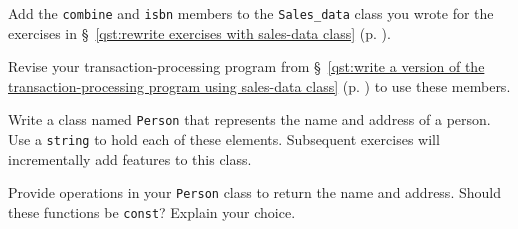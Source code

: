 %
%
\begin{question}
Add the \verb|combine| and \verb|isbn| members to the \verb|Sales_data|
class you wrote for the exercises in \S~\ref{qst:rewrite exercises with sales-data class} (p. \pageref{qst:rewrite exercises with sales-data class}).
\end{question}

\begin{question}\label{qst:revise your transaction-processing program using combine and isbn}
Revise your transaction-processing program from \S~\ref{qst:write a version of the transaction-processing program using sales-data class} (p.
\pageref{qst:write a version of the transaction-processing program using sales-data class}) to use these members.
\end{question}

\begin{question}\label{qst:write a class named person}
Write a class named \verb|Person| that represents the name and
address of a person. Use a \verb|string| to hold each of these elements.
Subsequent exercises will incrementally add features to this class.
\end{question}

\begin{question}
Provide operations in your \verb|Person| class to return the name
and address. Should these functions be \verb|const|? Explain your choice.
\end{question}
